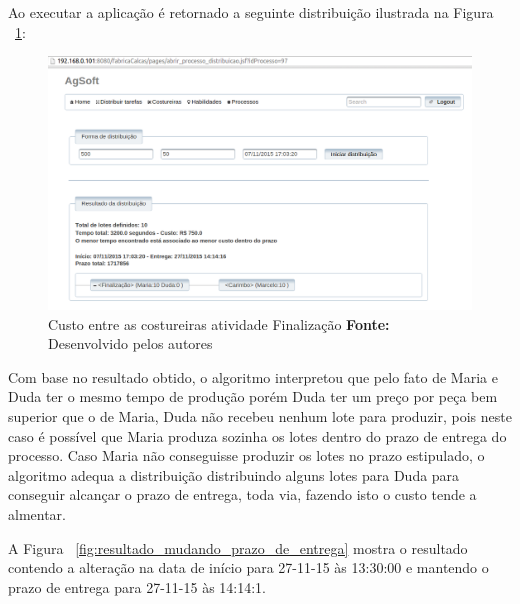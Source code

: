 \par Ao executar a aplicação é retornado a seguinte distribuição ilustrada na
Figura ~\ref{fig:resultado_custo}:

\newpage

\begin{figure}[h!]
	\centerline{\includegraphics[scale=0.4]{./imagens/resultado_teste2.png}}
	\caption[Custo entre as costureiras atividade Finalização]
	{Custo entre as costureiras atividade Finalização \textbf{Fonte:} Desenvolvido pelos autores}
	\label{fig:resultado_custo}
\end{figure}

\par Com base no resultado obtido, o algoritmo interpretou que pelo fato de
Maria e Duda ter o mesmo tempo de produção porém Duda ter um preço por peça bem
superior que o de Maria, Duda não recebeu nenhum lote para produzir, pois neste
caso é possível que Maria produza sozinha os lotes dentro do prazo de entrega do
processo. Caso Maria não conseguisse produzir os lotes no prazo estipulado, o
algoritmo adequa a distribuição distribuindo alguns lotes para Duda para
conseguir alcançar o prazo de entrega, toda via, fazendo isto o custo tende a
almentar.

\par A Figura ~\ref{fig:resultado_mudando_prazo_de_entrega} mostra o resultado
contendo a alteração na data de início para 27-11-15 às 13:30:00 e mantendo o
prazo de entrega para 27-11-15 às 14:14:1.

\newpage

